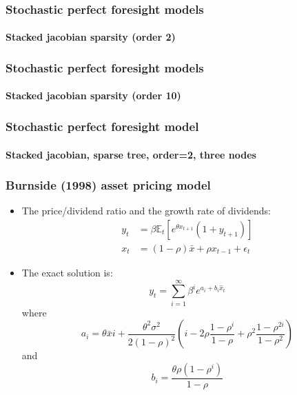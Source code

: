 \documentclass{beamer}
\begin{document}
\begin{frame}
   \frametitle{Stochastic perfect foresight models}
   \framesubtitle{Stacked jacobian sparsity (order 2)}
   \begin{center}
      \scalebox{.5}{
         }
   \end{center}

\end{frame}


\begin{frame}
   \frametitle{Stochastic perfect foresight models}
   \framesubtitle{Stacked jacobian sparsity (order 10)}
   \begin{center}
      \scalebox{.5}{
         }
   \end{center}

\end{frame}


\begin{frame}
   \frametitle{Stochastic perfect foresight model}
   \framesubtitle{Stacked jacobian, sparse tree, order=2, three nodes}
   \begin{center}
      \scalebox{.6}{
         }
   \end{center}

\end{frame}


\begin{frame}
   \frametitle{Burnside (1998) asset pricing model}

   \begin{itemize}

      \item The price/dividend ratio and the growth rate of dividends:
            \[
               \begin{split}
                  y_t & = \beta \mathbb E_t\left[e^{\theta x_{t+1}}\left(1+y_{t+1}\right)\right] \\
                  x_t & = (1-\rho)\bar x + \rho x_{t-1}+\epsilon_t
               \end{split}
            \]

      \item The exact solution is:
            \[
               y_t = \sum_{i=1}^\infty \beta^i e^{a_i+b_i\hat x_t}
            \]
            where
            \[
               a_i = \theta \bar x i +
               \frac{\theta^2\sigma^2}{2(1-\rho)^2}\left(i-2\rho\frac{1-\rho^i}{1-\rho}+\rho^2\frac{1-\rho^{2i}}{1-\rho^2}\right)
            \]
            and
            \[
               b_i = \frac{\theta\rho\left(1-\rho^i\right)}{1-\rho}
            \]

   \end{itemize}

\end{frame}
\end{document}
